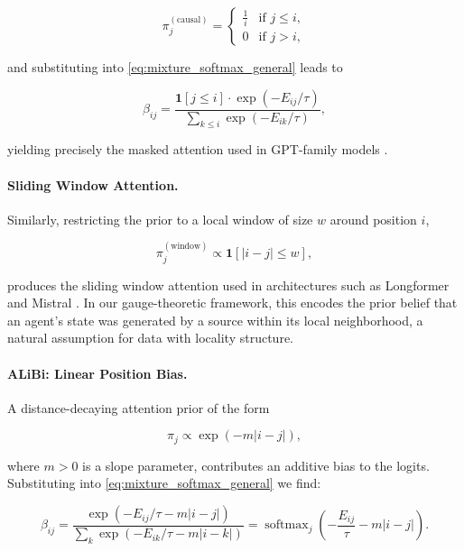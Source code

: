 \documentclass[twoside,11pt]{article}
\begin{document}
\begin{equation}
\pi_j^{(\text{causal})} = \begin{cases} \frac{1}{i} & \text{if } j \leq i, \\ 0 & \text{if } j > i, \end{cases}
\label{eq:causal_prior}
\end{equation}

and substituting into \eqref{eq:mixture_softmax_general} leads to

\begin{equation}
\beta_{ij} = \frac{\mathbf{1}[j \leq i] \cdot \exp(-E_{ij}/\tau)}{\sum_{k \leq i} \exp(-E_{ik}/\tau)},
\label{eq:causal_attention}
\end{equation}

yielding precisely the masked attention used in GPT-family models \citep{radford2019language}. 

\paragraph{Sliding Window Attention.}
Similarly, restricting the prior to a local window of size $w$ around position $i$,

\begin{equation}
\pi_j^{(\text{window})} \propto \mathbf{1}[|i - j| \leq w],
\label{eq:window_prior}
\end{equation}

produces the sliding window attention used in architectures such as Longformer \citep{beltagy2020longformer} and Mistral \citep{jiang2023mistral}. In our gauge-theoretic framework, this encodes the prior belief that an agent's state was generated by a source within its local neighborhood, a natural assumption for data with locality structure.

\paragraph{ALiBi: Linear Position Bias.}
A distance-decaying attention prior of the form

\begin{equation}
\pi_j \propto \exp(-m|i - j|),
\label{eq:alibi_prior}
\end{equation}

where $m > 0$ is a slope parameter, contributes an additive bias to the logits. Substituting into \eqref{eq:mixture_softmax_general} we find:

\begin{equation}
\beta_{ij} = \frac{\exp(-E_{ij}/\tau - m|i-j|)}{\sum_k \exp(-E_{ik}/\tau - m|i-k|)} = \operatorname{softmax}_j\!\left(-\frac{E_{ij}}{\tau} - m|i - j|\right).
\label{eq:alibi_attention}
\end{equation}
\end{document}
